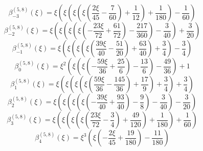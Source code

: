 \begin{equation}
\beta_{-3}^{(5,8)} (\xi) =
 \xi \left(\xi \left(\xi \left(\xi \left(\frac{2 \xi}{45}
 - \frac{7}{60}\right) + \frac{1}{12}\right) + \frac{1}{180}\right) - \frac{1}{60}\right)
\end{equation}
\begin{equation}
\beta_{-2}^{(5,8)} (\xi) =
 \xi \left(\xi \left(\xi \left(\xi \left(- \frac{23 \xi}{72}
 + \frac{61}{72}\right) - \frac{217}{360}\right) - \frac{3}{40}\right) + \frac{3}{20}\right)
\end{equation}
\begin{equation}
\beta_{-1}^{(5,8)} (\xi) =
 \xi \left(\xi \left(\xi \left(\xi \left(\frac{39 \xi}{40}
 - \frac{51}{20}\right) + \frac{63}{40}\right) + \frac{3}{4}\right) - \frac{3}{4}\right)
\end{equation}
\begin{equation}
\beta_{0}^{(5,8)} (\xi) =
 \xi^{2} \left(\xi \left(\xi \left(- \frac{59 \xi}{36}
 + \frac{25}{6}\right) - \frac{13}{6}\right) - \frac{49}{36}\right) + 1
\end{equation}
\begin{equation}
\beta_{1}^{(5,8)} (\xi) =
 \xi \left(\xi \left(\xi \left(\xi \left(\frac{59 \xi}{36}
 - \frac{145}{36}\right) + \frac{17}{9}\right) + \frac{3}{4}\right) + \frac{3}{4}\right)
\end{equation}
\begin{equation}
\beta_{2}^{(5,8)} (\xi) =
 \xi \left(\xi \left(\xi \left(\xi \left(- \frac{39 \xi}{40}
 + \frac{93}{40}\right) - \frac{9}{8}\right) - \frac{3}{40}\right) - \frac{3}{20}\right)
\end{equation}
\begin{equation}
\beta_{3}^{(5,8)} (\xi) =
 \xi \left(\xi \left(\xi \left(\xi \left(\frac{23 \xi}{72}
 - \frac{3}{4}\right) + \frac{49}{120}\right) + \frac{1}{180}\right) + \frac{1}{60}\right)
\end{equation}
\begin{equation}
\beta_{4}^{(5,8)} (\xi) =
 \xi^{3} \left(\xi \left(- \frac{2 \xi}{45} + \frac{19}{180}\right) - \frac{11}{180}\right)
\end{equation}
